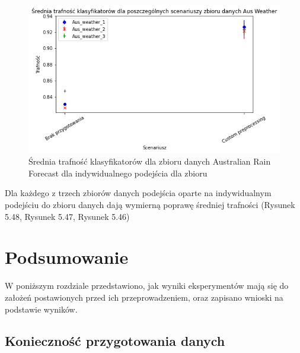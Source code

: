 \documentclass{book}
\begin{document}
\begin{figure}[H]
    \centerline{\includegraphics[scale=0.8]{Aus_Weather_Avg_Custom}}
    \centering
    \caption{Średnia trafność klasyfikatorów dla zbioru danych Australian Rain Forecast 
    dla indywidualnego podejścia dla zbioru}
    \end{figure}

    Dla każdego z trzech zbiorów danych podejścia 
    oparte na indywidualnym podejściu do zbioru 
    danych dają wymierną poprawę średniej trafności 
    (Rysunek 5.48, Rysunek 5.47, Rysunek 5.46)


\chapter{Podsumowanie}

W poniższym rozdziale przedstawiono, jak wyniki eksperymentów mają się do założeń postawionych 
przed ich przeprowadzeniem, oraz zapisano wnioski na podstawie wyników.

\section{Konieczność przygotowania danych}
\end{document}
